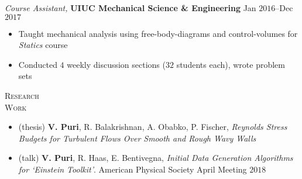 \documentclass[10pt]{article}
\begin{document}
\begin{multicols}{2}
\vspace{0.5em}
%
{\sl Course Assistant,} \textbf{UIUC Mechanical Science \& Engineering} \hfill Jan $2016$--Dec $2017$

\vspace{-1.75em}
\begin{itemize}[label=-]
    \setlength\itemsep{-0.25em}
    \item Taught mechanical analysis using free-body-diagrams and control-volumes for \textit{Statics} course
    \item Conducted $4$ weekly discussion sections ($32$ students each), wrote problem sets
\end{itemize}
\vspace{-2.0em}

\end{multicols}
\vspace{-1.5em}
\begin{multicols}{2}
\textsc{Research \\ Work}
\columnbreak

\vspace{-1.75em}
\begin{itemize}[label= ]
    \setlength{\itemindent}{-2.5em}
    \setlength\itemsep{-1.0\itemsep}
    \item (thesis) \textbf{V. Puri}, R. Balakrishnan, A. Obabko, P. Fischer, {\sl Reynolds Stress Budgets for Turbulent Flows Over Smooth and Rough Wavy Walls}
    \item (talk) \textbf{V. Puri}, R. Haas, E. Bentivegna, {\sl Initial Data Generation Algorithms for `Einstein Toolkit'}. American Physical Society April Meeting $2018$
\end{itemize}
\vspace{-2.0em}

\end{multicols}
\vspace{-1.5em}
\end{document}
